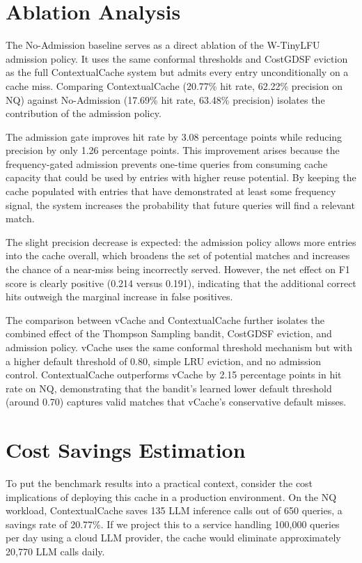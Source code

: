 \documentclass[12pt,a4paper]{report}
\begin{document}
\section{Ablation Analysis}

The No-Admission baseline serves as a direct ablation of the W-TinyLFU admission policy. It uses the same conformal thresholds and CostGDSF eviction as the full ContextualCache system but admits every entry unconditionally on a cache miss. Comparing ContextualCache (20.77\% hit rate, 62.22\% precision on NQ) against No-Admission (17.69\% hit rate, 63.48\% precision) isolates the contribution of the admission policy.

The admission gate improves hit rate by 3.08 percentage points while reducing precision by only 1.26 percentage points. This improvement arises because the frequency-gated admission prevents one-time queries from consuming cache capacity that could be used by entries with higher reuse potential. By keeping the cache populated with entries that have demonstrated at least some frequency signal, the system increases the probability that future queries will find a relevant match.

The slight precision decrease is expected: the admission policy allows more entries into the cache overall, which broadens the set of potential matches and increases the chance of a near-miss being incorrectly served. However, the net effect on F1 score is clearly positive (0.214 versus 0.191), indicating that the additional correct hits outweigh the marginal increase in false positives.

The comparison between vCache and ContextualCache further isolates the combined effect of the Thompson Sampling bandit, CostGDSF eviction, and admission policy. vCache uses the same conformal threshold mechanism but with a higher default threshold of 0.80, simple LRU eviction, and no admission control. ContextualCache outperforms vCache by 2.15 percentage points in hit rate on NQ, demonstrating that the bandit's learned lower default threshold (around 0.70) captures valid matches that vCache's conservative default misses.

\section{Cost Savings Estimation}

To put the benchmark results into a practical context, consider the cost implications of deploying this cache in a production environment. On the NQ workload, ContextualCache saves 135 LLM inference calls out of 650 queries, a savings rate of 20.77\%. If we project this to a service handling 100,000 queries per day using a cloud LLM provider, the cache would eliminate approximately 20,770 LLM calls daily.
\end{document}
